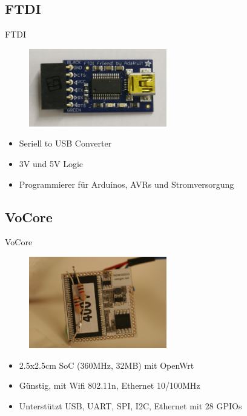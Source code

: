 \documentclass{beamer}
\begin{document}
\subsection{FTDI}
\begin{frame}{FTDI}
\begin{figure}[h]
 \centering
 \includegraphics[width=6cm,keepaspectratio=true]{./img/_MG_4517.JPG}
\end{figure}
\begin{itemize}
 \item Seriell to USB Converter
 \item 3V und 5V Logic
 \item Programmierer für Arduinos, AVRs und Stromversorgung
\end{itemize}

\end{frame}


\subsection{VoCore}
\begin{frame}{VoCore}
\begin{figure}[h]
 \centering
 \includegraphics[width=6cm,keepaspectratio=true]{./img/_MG_4492.JPG}
\end{figure}
\begin{itemize}
 \item 2.5x2.5cm SoC (360MHz, 32MB) mit OpenWrt
 \item Günstig, mit Wifi 802.11n, Ethernet 10/100MHz
 \item Unterstützt USB, UART, SPI, I2C, Ethernet mit 28 GPIOs
\end{itemize}
\end{frame}
\end{document}
